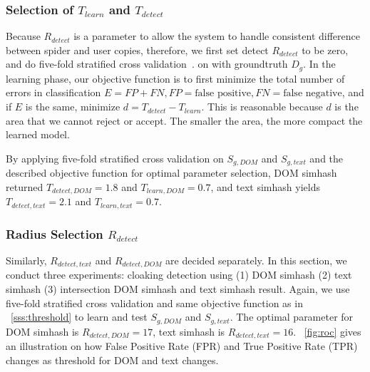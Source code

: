 \subsubsection{Selection of $T_{learn}$ and $T_{detect}$}
\label{sss:threshold}
Because $R_{detect}$ is a parameter to allow the system to handle consistent
difference between spider and user copies, therefore, we first set detect
$R_{detect}$ to be zero, and do five-fold stratified cross validation~\cite{scikit-learn}.
on with groundtruth $D_{g}$. In the learning phase,
our objective function is to first minimize the total number of errors in
classification $E = FP + FN, FP = \text{false positive}, FN = \text{false
negative}$, and
if $E$ is the same, minimize $d = T_{detect} - T_{learn}$.
This is reasonable because $d$ is the area that we cannot reject or accept. The smaller
the area, the more compact the learned model.

By applying five-fold stratified cross validation on $S_{g, DOM}$ and $S_{g, text}$ and the described
objective function for optimal parameter selection, DOM simhash returned 
$T_{detect, DOM} = 1.8$ and $T_{learn, DOM} = 0.7$, and text simhash yields
$T_{detect, text} = 2.1$ and $T_{learn, text} = 0.7$.
%

\subsubsection{Radius Selection $R_{detect}$}
Similarly, $R_{detect, text}$ and $R_{detect, DOM}$ are decided separately. In this section, we conduct
three experiments: cloaking detection using (1) DOM simhash (2) text simhash (3)
intersection DOM simhash and text simhash result.
Again, we use five-fold stratified cross validation and same objective function as in
~\autoref{sss:threshold} to learn and test $S_{g, DOM}$ and
$S_{g, text}$. The
optimal parameter for DOM simhash is $R_{detect, DOM} = 17$, text simhash is
$R_{detect, text} = 16$. ~\autoref{fig:roc} gives an illustration on
how False Positive Rate (FPR) and True Positive Rate (TPR) changes as
threshold for DOM and text changes. 

